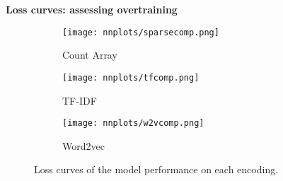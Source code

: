 \documentclass{article}
\begin{document}
\textbf{Loss curves: assessing overtraining}
\begin{figure}[H]
     \centering
     \begin{subfigure}[b]{0.32\textwidth}
         \centering
         \texttt{[image: nnplots/sparsecomp.png]}\hspace{0cm}
         \caption{Count Array}
     \end{subfigure}
     \begin{subfigure}[b]{0.32\textwidth}
         \centering
         \texttt{[image: nnplots/tfcomp.png]}\hspace{-0.1cm}
         \caption{TF-IDF}
     \end{subfigure}
     \begin{subfigure}[b]{0.32\textwidth}
         \centering
         \texttt{[image: nnplots/w2vcomp.png]}\hspace{-0.1cm}
         \caption{Word2vec}
     \end{subfigure}
        \caption{Loss curves of the model performance on each encoding.}
        \label{fig:loss}
\end{figure}
\end{document}
